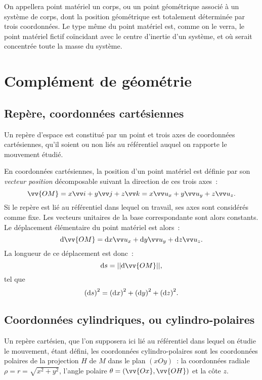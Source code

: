 On appellera point matériel un corps, ou un point géométrique associé à un système de corps, dont la position géométrique est totalement déterminée par trois coordonnées. Le type même du point matériel est, comme on le verra, le point matériel fictif coïncidant avec le centre d'inertie d'un système, et où serait concentrée toute la masse du système.

\section{Complément de géométrie}\label{chap1-sec:complementdegeometrie}

\subsection{Repère, coordonnées cartésiennes}\label{chap1-subsec:reperecoord}

Un repère d'espace est constitué par un point et trois axes de coordonnées cartésiennes, qu'il soient ou non liés au référentiel auquel on rapporte le mouvement étudié.

En coordonnées cartésiennes, la position d'un point matériel est définie par son \emph{vecteur position} décomposable suivant la direction de ces trois axes~:
\begin{equation}
  \vv{OM}=x\vi+y\vj+z\vk=x\ux+y\uy+z\uz.
\end{equation}
Si le repère est lié au référentiel dans lequel on travail, ses axes sont considérés comme fixe. Les vecteurs unitaires de la base correspondante sont alors constants. Le déplacement élémentaire du point matériel est alors~:
\begin{equation}
  \D\vv{OM}=\D x\ux+\D y\uy+\D z\uz.
\end{equation}
La longueur de ce déplacement est donc~:
\begin{equation}
  \D s = ||\D\vv{OM}||,
\end{equation}
tel que
\begin{equation}
    {(\mathrm{d}s)}^2={(\mathrm{d} x)}^2+{(\mathrm{d} y)}^2+ {(\mathrm{d} z)}^2.
\end{equation}

\subsection{Coordonnées cylindriques, ou cylindro-polaires}\label{chap1-subsec:coordcylindriques}

Un repère cartésien, que l'on supposera ici lié au référentiel dans lequel on étudie le mouvement, étant défini, les coordonnées cylindro-polaires sont les coordonnées polaires de la projection \(H\) de \(M\) dans le plan \((xOy)\)~: la coordonnées radiale \(\rho=r=\sqrt{x^2+y^2}\), l'angle polaire \(\theta=(\vv{Ox}, \vv{OH})\) et la côte \(z\).

